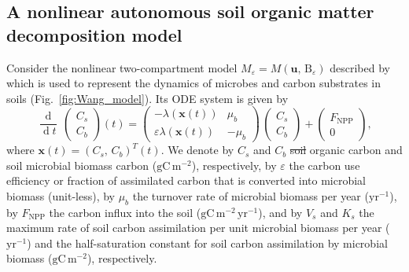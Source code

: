 \documentclass[smallextended]{svjour3}
\renewcommand{\tens}[1]{\mathrm{#1}}
\renewcommand{\vec}[1]{\mathbf{#1}}
\newcommand{\deriv}[1]{\frac{\operatorname{d}}{\operatorname{d}#1}}
\newcommand{\gC}{\mathrm{gC}}
\newcommand{\yr}{\mathrm{yr}}
\newcommand{\meter}{\mathrm{m}}
\newcommand{\transpose}{T}
\newcommand{\NPP}{\ensuremath{\mathrm{NPP}}}
\providecommand{\DIFaddtex}[1]{{\protect\color{blue}\uwave{#1}}} %
\providecommand{\DIFdeltex}[1]{{\protect\color{red}\sout{#1}}}                      %
\providecommand{\DIFaddbegin}{} %
\providecommand{\DIFaddend}{} %
\providecommand{\DIFdelbegin}{} %
\providecommand{\DIFdelend}{} %
\providecommand{\DIFadd}[1]{\texorpdfstring{\DIFaddtex{#1}}{#1}} %
\providecommand{\DIFdel}[1]{\texorpdfstring{\DIFdeltex{#1}}{}} %
\newcommand{\DIFscaledelfig}{0.5}
\newlength{\DIFdelgraphicswidth} %
\newlength{\DIFdelgraphicsheight} %
\newcommand{\DIFaddincludegraphics}[2][]{{\color{blue}\fbox{\DIFOincludegraphics[#1]{#2}}}} %
\newcommand{\DIFdelincludegraphics}[2][]{%
\sbox{\DIFdelgraphicsbox}{\DIFOincludegraphics[#1]{#2}}%
\settoboxwidth{\DIFdelgraphicswidth}{\DIFdelgraphicsbox} %
\settoboxtotalheight{\DIFdelgraphicsheight}{\DIFdelgraphicsbox} %
\scalebox{\DIFscaledelfig}{%
\parbox[b]{\DIFdelgraphicswidth}{\usebox{\DIFdelgraphicsbox}\\[-\baselineskip] \rule{\DIFdelgraphicswidth}{0em}}\llap{\resizebox{\DIFdelgraphicswidth}{\DIFdelgraphicsheight}{%
\setlength{\unitlength}{\DIFdelgraphicswidth}%
\begin{picture}(1,1)%
\thicklines\linethickness{2pt} %
{\color[rgb]{1,0,0}\put(0,0){\framebox(1,1){}}}%
{\color[rgb]{1,0,0}\put(0,0){\line( 1,1){1}}}%
{\color[rgb]{1,0,0}\put(0,1){\line(1,-1){1}}}%
\end{picture}%
}\hspace*{3pt}}} %
} %
\DeclareRobustCommand{\DIFaddbegin}{\DIFOaddbegin \let\includegraphics\DIFaddincludegraphics} %
\DeclareRobustCommand{\DIFaddend}{\DIFOaddend \let\includegraphics\DIFOincludegraphics} %
\DeclareRobustCommand{\DIFdelbegin}{\DIFOdelbegin \let\includegraphics\DIFdelincludegraphics} %
\DeclareRobustCommand{\DIFdelend}{\DIFOaddend \let\includegraphics\DIFOincludegraphics} %
\begin{document}
\subsection{A nonlinear autonomous soil organic matter decomposition model}
\label{sec:example_2}
Consider the nonlinear two-compartment model $M_\varepsilon=M(\vec{u},\,\tens{B}_\varepsilon)$ described by \citet{Wang2014BG} which is used to represent the dynamics of microbes and carbon substrates in soils (Fig.~\ref{fig:Wang_model}). Its ODE system is given by
\begin{equation}
    \deriv{t}\,\begin{pmatrix}C_{s}\\C_{b}\end{pmatrix}(t) = 
    \begin{pmatrix}
      -\lambda(\vec{x}(t)) & \mu_{b}\\
      \varepsilon \lambda(\vec{x}(t)) & - \mu_{b}
    \end{pmatrix}
    \, \begin{pmatrix}C_{s}\\C_{b}\end{pmatrix}
    + \begin{pmatrix}F_{\NPP}\\0\end{pmatrix},
\end{equation}
where $\vec{x}(t)=(C_{s},\,C_{b})^{\transpose}(t)$.
We denote by $C_s$ and $C_b$ \DIFdelbegin \DIFdel{soil }\DIFdelend \DIFaddbegin \DIFadd{substrate }\DIFaddend organic carbon and soil microbial biomass carbon ($\gC\,\meter^{-2}$), respectively, by $\varepsilon$ the carbon use efficiency or fraction of assimilated carbon that is converted into microbial biomass (unit-less), by $\mu_b$ the turnover rate of microbial biomass per year ($\yr^{-1}$), by $F_{\NPP}$ the carbon influx into the soil ($\gC\,\meter^{-2}\,\yr^{-1}$), and by $V_s$ and $K_s$ the maximum rate of soil carbon assimilation per unit microbial biomass per year ($\yr^{-1}$) and the half-saturation constant for soil carbon assimilation by microbial biomass ($\gC\,\meter^{-2}$), respectively.
\end{document}
